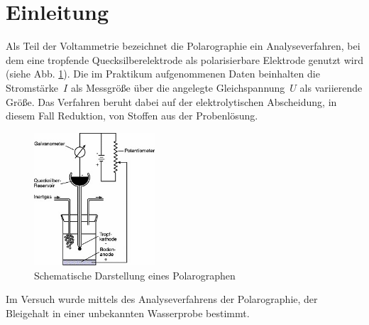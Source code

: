 
\section{Einleitung}
\label{sec:einleitung}

Als Teil der Voltammetrie bezeichnet die Polarographie ein Analyseverfahren, bei dem eine tropfende Quecksilberelektrode als polarisierbare Elektrode genutzt wird (siehe Abb. \ref{fig:schema_polarograph}). Die im Praktikum aufgenommenen Daten beinhalten die \mbox{Stromstärke $I$} als Messgröße über die angelegte \mbox{Gleichspannung $U$} als variierende Größe. Das Verfahren beruht dabei auf der elektrolytischen Abscheidung, in diesem Fall Reduktion, von Stoffen aus der Probenlösung.\cite{Brehm.2004}

\begin{figure}[h!]
	\centering
	\includegraphics[width=0.4\textwidth]{img/Polarograph}
	\caption{Schematische Darstellung eines Polarographen \cite{Brehm.2004}}
	\label{fig:schema_polarograph}
\end{figure}
\FloatBarrier

Im Versuch wurde mittels des Analyseverfahrens der Polarographie, der Bleigehalt in einer unbekannten Wasserprobe bestimmt.